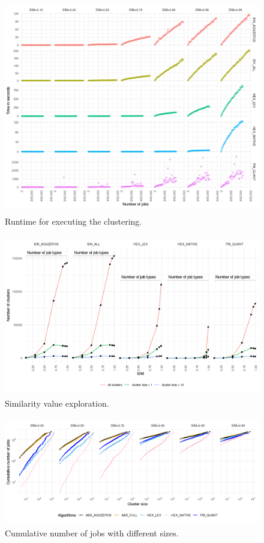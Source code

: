 \documentclass[]{llncs}
\begin{document}
\begin{figure}
  \centering
  \includegraphics[width=4.61in,height=3.68in]{./media/image18.png}
  \caption{Runtime for executing the clustering.}
  \label{fig:alg_runtimes}
\end{figure}


\begin{figure}
  \centering
  \includegraphics[width=4.61in,height=2.76in]{./media/image19.png}
  \caption{Similarity value exploration.}
  \label{fig:sim_eploration}
\end{figure}


\begin{figure}
  \centering
  \includegraphics[width=4.61in,height=1.85in]{./media/image22.png}
  \caption{Cumulative number of jobs with different sizes.}
  \label{fig:cum_num_job_sizes}
\end{figure}
\end{document}
